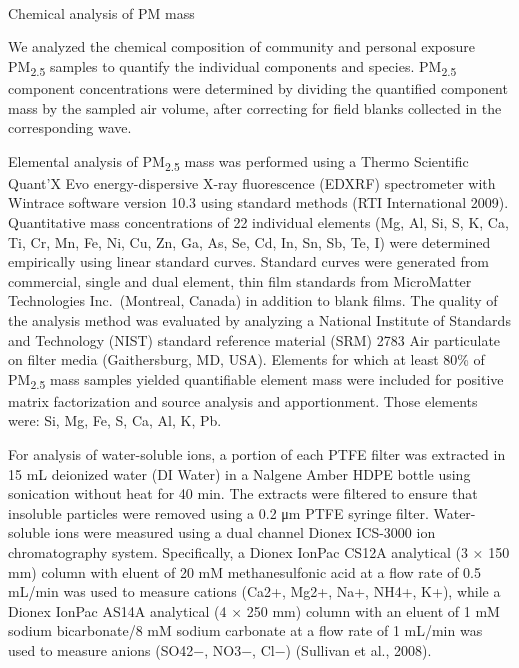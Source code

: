 \documentclass[
  letterpaper,
  DIV=11,
  numbers=noendperiod]{scrartcl}
\makeatletter
\let\oldparagraph\paragraph
\renewcommand{\paragraph}{
    \@ifstar
      \xxxParagraphStar
      \xxxParagraphNoStar
  }
\newcommand{\xxxParagraphStar}[1]{\oldparagraph*{#1}\mbox{}}
\newcommand{\xxxParagraphNoStar}[1]{\oldparagraph{#1}\mbox{}}
\makeatother
\begin{document}
\paragraph{Chemical analysis of PM
mass}\label{chemical-analysis-of-pm-mass}

We analyzed the chemical composition of community and personal exposure
PM\textsubscript{2.5} samples to quantify the individual components and
species. PM\textsubscript{2.5} component concentrations were determined
by dividing the quantified component mass by the sampled air volume,
after correcting for field blanks collected in the corresponding wave.

Elemental analysis of PM\textsubscript{2.5} mass was performed using a
Thermo Scientific Quant'X Evo energy-dispersive X-ray fluorescence
(EDXRF) spectrometer with Wintrace software version 10.3 using standard
methods (RTI International 2009). Quantitative mass concentrations of 22
individual elements (Mg, Al, Si, S, K, Ca, Ti, Cr, Mn, Fe, Ni, Cu, Zn,
Ga, As, Se, Cd, In, Sn, Sb, Te, I) were determined empirically using
linear standard curves. Standard curves were generated from commercial,
single and dual element, thin film standards from MicroMatter
Technologies Inc.~(Montreal, Canada) in addition to blank films. The
quality of the analysis method was evaluated by analyzing a National
Institute of Standards and Technology (NIST) standard reference material
(SRM) 2783 Air particulate on filter media (Gaithersburg, MD, USA).
Elements for which at least 80\% of PM\textsubscript{2.5} mass samples
yielded quantifiable element mass were included for positive matrix
factorization and source analysis and apportionment. Those elements
were: Si, Mg, Fe, S, Ca, Al, K, Pb.

For analysis of water-soluble ions, a portion of each PTFE filter was
extracted in 15 mL deionized water (DI Water) in a Nalgene Amber HDPE
bottle using sonication without heat for 40 min. The extracts were
filtered to ensure that insoluble particles were removed using a 0.2 μm
PTFE syringe filter. Water-soluble ions were measured using a dual
channel Dionex ICS-3000 ion chromatography system. Specifically, a
Dionex IonPac CS12A analytical (3 × 150 mm) column with eluent of 20 mM
methanesulfonic acid at a flow rate of 0.5 mL/min was used to measure
cations (Ca2+, Mg2+, Na+, NH4+, K+), while a Dionex IonPac AS14A
analytical (4 × 250 mm) column with an eluent of 1 mM sodium
bicarbonate/8 mM sodium carbonate at a flow rate of 1 mL/min was used to
measure anions (SO42−, NO3−, Cl−) (Sullivan et al., 2008).
\end{document}
